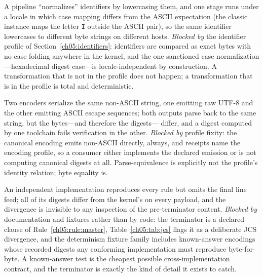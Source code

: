 \begin{example}\label{ch05:ex:locale}
A pipeline ``normalizes'' identifiers by lowercasing them, and one
stage runs under a locale in which case mapping differs from the ASCII
expectation (the classic instance maps the letter \texttt{I} outside
the ASCII pair), so the same identifier lowercases to different byte
strings on different hosts. \emph{Blocked by} the identifier profile of
Section~\ref{ch05:identifiers}: identifiers are compared as exact bytes
with no case folding anywhere in the kernel, and the one sanctioned
case normalization---hexadecimal digest case---is locale-independent by
construction. A transformation that is not in the profile does not
happen; a transformation that is in the profile is total and
deterministic.
\end{example}

\begin{example}\label{ch05:ex:escape}
Two encoders serialize the same non-ASCII string, one emitting raw
UTF-8 and the other emitting ASCII escape sequences; both outputs parse
back to the same string, but the bytes---and therefore the digests---
differ, and a digest computed by one toolchain fails verification in
the other. \emph{Blocked by} profile fixity: the canonical encoding
emits non-ASCII directly, always, and receipts name the encoding
profile, so a consumer either implements the declared emission or is
not computing canonical digests at all. Parse-equivalence is explicitly
not the profile's identity relation; byte equality is.
\end{example}

\begin{example}\label{ch05:ex:terminator}
An independent implementation reproduces every rule but omits the final
line feed; all of its digests differ from the kernel's on every
payload, and the divergence is invisible to any inspection of the
pre-terminator content. \emph{Blocked by} documentation and fixtures
rather than by code: the terminator is a declared clause of
Rule~\ref{ch05:rule:master}, Table~\ref{ch05:tab:jcs} flags it as a
deliberate JCS divergence, and the determinism fixture family includes
known-answer encodings whose recorded digests any conforming
implementation must reproduce byte-for-byte. A known-answer test is the
cheapest possible cross-implementation contract, and the terminator is
exactly the kind of detail it exists to catch.
\end{example}

